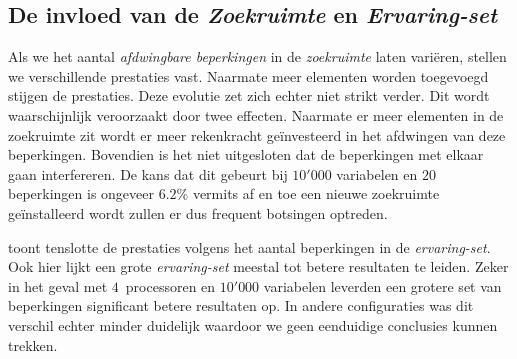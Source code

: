\subsection{De invloed van de \emph{Zoekruimte} en \emph{Ervaring-set}}


Als we het aantal \emph{afdwingbare beperkingen} in de \emph{zoekruimte} laten vari\"eren, stellen we verschillende prestaties vast. Naarmate meer elementen worden toegevoegd stijgen de prestaties. Deze evolutie zet zich echter niet strikt verder. Dit wordt waarschijnlijk veroorzaakt door twee effecten. Naarmate er meer elementen in de zoekruimte zit wordt er meer rekenkracht ge\"investeerd in het afdwingen van deze beperkingen. Bovendien is het niet uitgesloten dat de beperkingen met elkaar gaan interfereren. De kans dat dit gebeurt bij $10'000$ variabelen en $20$ beperkingen is ongeveer $6.2\%$ vermits af en toe een nieuwe zoekruimte ge\"installeerd wordt zullen er dus frequent botsingen optreden.


 toont tenslotte de prestaties volgens het aantal beperkingen in de \emph{ervaring-set}. Ook hier lijkt een grote \emph{ervaring-set} meestal tot betere resultaten te leiden. Zeker in het geval met $4$~processoren en $10'000$ variabelen leverden een grotere set van beperkingen significant betere resultaten op. In andere configuraties was dit verschil echter minder duidelijk waardoor we geen eenduidige conclusies kunnen trekken.
